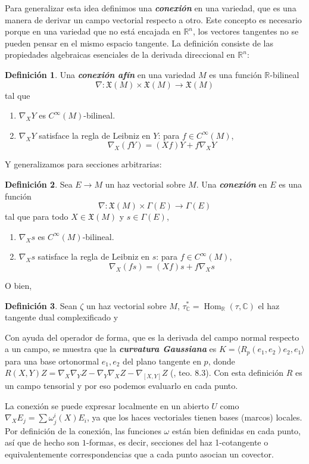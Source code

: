 \documentclass[spanish]{article}
\theoremstyle{definition}
\newtheorem*{defn}{Definición}
\newcommand{\R}{\mathbb{R}}
\newcommand{\C}{\mathbb{C}}
\newcommand{\X}{\mathfrak{X}}
\newcommand{\Cinf}{C^\infty}
\DeclareMathOperator{\Hom}{Hom}
\begin{document}
	Para generalizar esta idea definimos una \textit{\textbf{conexión}} en una variedad, que es una manera de derivar un campo vectorial respecto a otro. Este concepto es necesario porque en una variedad que no está encajada en $\R^n$, los vectores tangentes no se pueden pensar en el mismo espacio tangente. La definición consiste de las propiedades algebraicas esenciales de la derivada direccional en $\R^n$:
	
	\begin{defn}
		Una \textbf{\textit{conexión afín}} en una variedad $M$ es una función $\R$-bilineal
		\[\nabla:\X(M)\times\X(M)\to\X(M)\]
		tal que
		\begin{enumerate}
			\item $\nabla_XY$ es $\Cinf(M)$-bilineal.
			\item $\nabla_XY$ satisface la regla de Leibniz en $Y$: para $f\in\Cinf(M)$,
			\[\nabla_X(fY)=(Xf)Y+f\nabla_XY\]
		\end{enumerate}
	\end{defn}
	Y generalizamos para secciones arbitrarias:
	\begin{defn}
		Sea $E\to M$ un haz vectorial sobre $M$. Una \textbf{\textit{conexión}} en $E$ es una función
		\[\nabla:\X(M)\times\Gamma(E)\to \Gamma(E)\]
		tal que para todo $X\in\X(M)$ y $s\in\Gamma(E)$,
		\begin{enumerate}
			\item $\nabla_Xs$ es $\Cinf(M)$-bilineal.
			\item $\nabla_Xs$ satisface la regla de Leibniz en $s$: para $f\in\Cinf(M)$,
			\[\nabla_X(fs)=(Xf)s+f\nabla_Xs\]
		\end{enumerate}
	\end{defn}
	O bien,
	\begin{defn}
		Sean $\zeta$ un haz vectorial sobre $M$, $\tau^*_\C=\Hom_\R(\tau,\C)$ el haz tangente dual complexificado y 
	\end{defn}
	
	Con ayuda del operador de forma, que es la derivada del campo normal respecto a un campo, se muestra que la \textbf{\textit{curvatura Gaussiana}} es $K=\langle R_p(e_1,e_2)e_2,e_1\rangle$ para una base ortonormal $e_1,e_2$ del plano tangente en $p$, donde $R(X,Y)Z=\nabla_X\nabla_YZ-\nabla_Y\nabla_XZ-\nabla_{[X,Y]}Z$ (\cite{Loring-dif}, teo. 8.3). Con esta definición $R$ es un campo tensorial y por eso podemos evaluarlo en cada punto.
	
	La conexión se puede expresar localmente en un abierto $U$ como $\nabla_XE_j=\sum\omega_j^i(X)E_i$, ya que los haces vectoriales tienen bases (marcos) locales. Por definición de la conexión, las funciones $\omega$ están bien definidas en cada punto, así que de hecho son $1$-formas, es decir, secciones del haz 1-cotangente o equivalentemente correspondencias que a cada punto asocian un covector.
	
\end{document}
